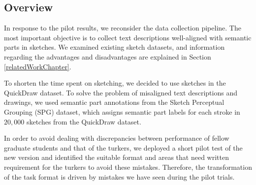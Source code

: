 
\subsection{Overview}
In response to the pilot results, we reconsider the data collection pipeline. The most important objective is to collect text descriptions well-aligned with semantic parts in sketches. 
We examined existing sketch datasets, and information regarding the advantages and disadvantages are explained in Section \ref{relatedWorkChapter}.    

To shorten the time spent on sketching, we decided to use sketches in the QuickDraw dataset. 
To solve the problem of misaligned text descriptions and drawings, we used semantic part annotations from the Sketch Perceptual Grouping (SPG) dataset, which assigns semantic part labels for each stroke in $20,000$ sketches from the QuickDraw dataset.  


In order to avoid dealing with discrepancies between performance of fellow graduate students and that of the turkers, we deployed a short pilot test of the new version and identified the suitable format and areas that need written requirement for the turkers to avoid these mistakes.   
Therefore, the transformation of the task format is driven by mistakes we have seen during the pilot trials. 

